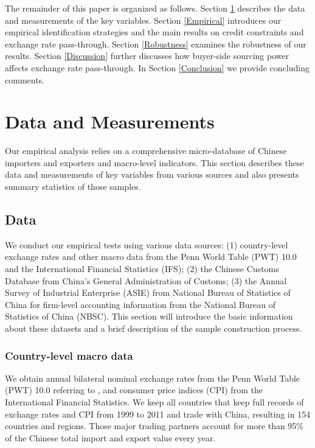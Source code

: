 The remainder of this paper is organized as follows. Section \ref{Data&Measurements} describes the data and measurements of the key variables. Section \ref{Empirical} introduces our empirical identification strategies and the main results on credit constraints and exchange rate pass-through. Section \ref{Robustness} examines the robustness of our results.  Section \ref{Discussion} further discusses how buyer-side sourcing power affects exchange rate pass-through. In Section \ref{Conclusion} we provide concluding comments.

\section{Data and Measurements} \label{Data&Measurements}

Our empirical analysis relies on a comprehensive micro-database of Chinese importers and exporters and macro-level indicators. This section describes these data and measurements of key variables from various sources and also presents summary statistics of those samples.

\subsection{Data} \label{Data}

We conduct our empirical tests using various data sources: (1) country-level exchange rates and other macro data from the Penn World Table (PWT) 10.0 and the International Financial Statistics (IFS); (2) the Chinese Customs Database from China’s General Administration of Customs; (3) the Annual Survey of Industrial Enterprise (ASIE) from National Bureau of Statistics of China for firm-level accounting information from the National Bureau of Statistics of China (NBSC). This section will introduce the basic information about these datasets and a brief description of the sample construction process.

\subsubsection{Country-level macro data} \label{Data-Macro}

We obtain annual bilateral nominal exchange rates from the Penn World Table (PWT) 10.0 referring to \cite{feenstra2015}, and consumer price indices (CPI) from the International Financial Statistics. We keep all countries that keep full records of exchange rates and CPI from 1999 to 2011 and trade with China, resulting in 154 countries and regions. Those major trading partners account for more than 95\% of the Chinese total import and export value every year.

